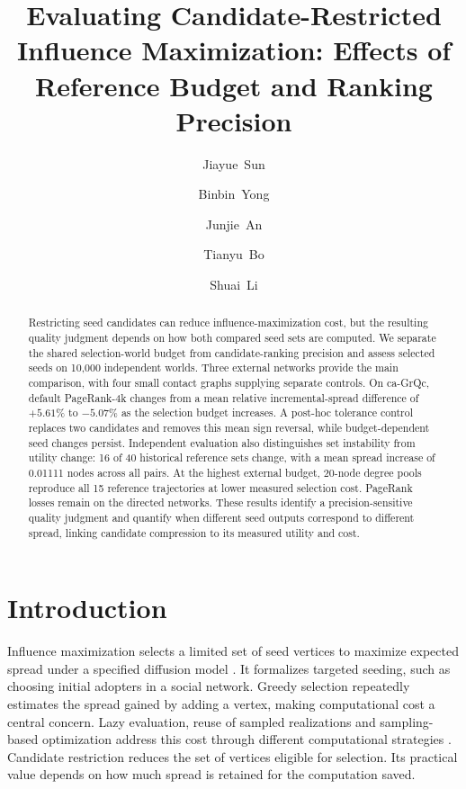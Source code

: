 \documentclass[smallextended]{svjour3}
\begin{document}
\title{Evaluating Candidate-Restricted Influence Maximization: Effects of Reference Budget and Ranking Precision}
\author{\mbox{Jiayue Sun} \and \mbox{Binbin Yong} \and \mbox{Junjie An} \and \mbox{Tianyu Bo} \and \mbox{Shuai Li}}
\date{}
\maketitle
\begin{abstract}
Restricting seed candidates can reduce influence-maximization cost, but the resulting quality judgment depends on how both compared seed sets are computed. We separate the shared selection-world budget from candidate-ranking precision and assess selected seeds on 10,000 independent worlds. Three external networks provide the main comparison, with four small contact graphs supplying separate controls. On ca-GrQc, default PageRank-4k changes from a mean relative incremental-spread difference of $+5.61$\% to $-5.07$\% as the selection budget increases. A post-hoc tolerance control replaces two candidates and removes this mean sign reversal, while budget-dependent seed changes persist. Independent evaluation also distinguishes set instability from utility change: 16 of 40 historical reference sets change, with a mean spread increase of 0.01111 nodes across all pairs. At the highest external budget, 20-node degree pools reproduce all 15 reference trajectories at lower measured selection cost. PageRank losses remain on the directed networks. These results identify a precision-sensitive quality judgment and quantify when different seed outputs correspond to different spread, linking candidate compression to its measured utility and cost.
\end{abstract}

\section{Introduction}
Influence maximization selects a limited set of seed vertices to maximize expected spread under a specified diffusion model \cite{ref1}. It formalizes targeted seeding, such as choosing initial adopters in a social network. Greedy selection repeatedly estimates the spread gained by adding a vertex, making computational cost a central concern. Lazy evaluation, reuse of sampled realizations and sampling-based optimization address this cost through different computational strategies \cite{ref7,ref8,ref2}. Candidate restriction reduces the set of vertices eligible for selection. Its practical value depends on how much spread is retained for the computation saved.
\end{document}
